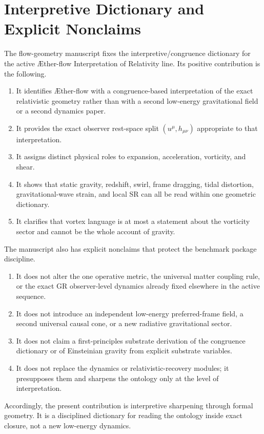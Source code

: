 \documentclass[11pt]{article}
\newcommand{\Aflow}{\AE{}ther-flow}
\newcommand{\TheoryName}{\Aflow{} Interpretation of Relativity}
\begin{document}
\section{Interpretive Dictionary and Explicit Nonclaims}

The flow-geometry manuscript fixes the interpretive/congruence dictionary for the active \TheoryName{} line. Its positive contribution is the following.
\begin{enumerate}
    \item It identifies \Aflow{} with a congruence-based interpretation of the exact relativistic geometry rather than with a second low-energy gravitational field or a second dynamics paper.
    \item It provides the exact observer rest-space split \((u^\mu,h_{\mu\nu})\) appropriate to that interpretation.
    \item It assigns distinct physical roles to expansion, acceleration, vorticity, and shear.
    \item It shows that static gravity, redshift, swirl, frame dragging, tidal distortion, gravitational-wave strain, and local SR can all be read within one geometric dictionary.
    \item It clarifies that vortex language is at most a statement about the vorticity sector and cannot be the whole account of gravity.
\end{enumerate}

The manuscript also has explicit nonclaims that protect the benchmark package discipline.
\begin{enumerate}
    \item It does not alter the one operative metric, the universal matter coupling rule, or the exact GR observer-level dynamics already fixed elsewhere in the active sequence.
    \item It does not introduce an independent low-energy preferred-frame field, a second universal causal cone, or a new radiative gravitational sector.
    \item It does not claim a first-principles substrate derivation of the congruence dictionary or of Einsteinian gravity from explicit substrate variables.
    \item It does not replace the dynamics or relativistic-recovery modules; it presupposes them and sharpens the ontology only at the level of interpretation.
\end{enumerate}

Accordingly, the present contribution is interpretive sharpening through formal geometry. It is a disciplined dictionary for reading the ontology inside exact closure, not a new low-energy dynamics.
\end{document}
